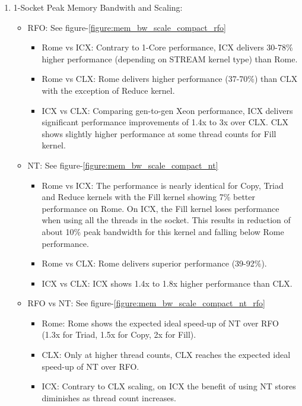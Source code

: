 \documentclass{article}
\begin{document}
\begin{enumerate}
\begin{itemize}
   \end{itemize}

\item 1-Socket Peak Memory Bandwith and Scaling:
   \begin{itemize}
   \item RFO: See figure-\ref{figure:mem_bw_scale_compact_rfo}
      \begin{itemize}
         \item Rome vs ICX: Contrary to 1-Core performance, ICX delivers 30-78\% higher performance (depending on STREAM kernel type) than Rome.
         \item Rome vs CLX: Rome delivers higher performance (37-70\%) than CLX with the exception of Reduce kernel.
         \item ICX vs CLX: Comparing gen-to-gen Xeon performance, ICX delivers significant performance improvements of 1.4x to 3x over CLX. CLX shows slightly higher performance at some thread counts for Fill kernel.
   \end{itemize}

   \item NT: See figure-\ref{figure:mem_bw_scale_compact_nt}
      \begin{itemize}
         \item Rome vs ICX: The performance is nearly identical for Copy, Triad and Reduce kernels with the Fill kernel showing 7\% better performance on Rome. On ICX, the Fill kernel loses performance when using all the threads in the socket. This results in reduction of about 10\% peak bandwidth for this kernel and falling below Rome performance.
         \item Rome vs CLX: Rome delivers superior performance (39-92\%).
         \item ICX vs CLX: ICX shows 1.4x to 1.8x higher performance than CLX.
      \end{itemize}
   \end{itemize}

   \begin{itemize}
       \item RFO vs NT: See figure-\ref{figure:mem_bw_scale_compact_nt_rfo}
          \begin{itemize}
             \item Rome: Rome shows the expected ideal speed-up of NT over RFO (1.3x for Triad, 1.5x for Copy, 2x for Fill).
             \item CLX: Only at higher thread counts, CLX reaches the expected ideal speed-up of NT over RFO.
             \item ICX: Contrary to CLX scaling, on ICX the benefit of using NT stores diminishes as thread count increases.
          \end{itemize}
    \end{itemize}



\end{enumerate}
\end{document}
